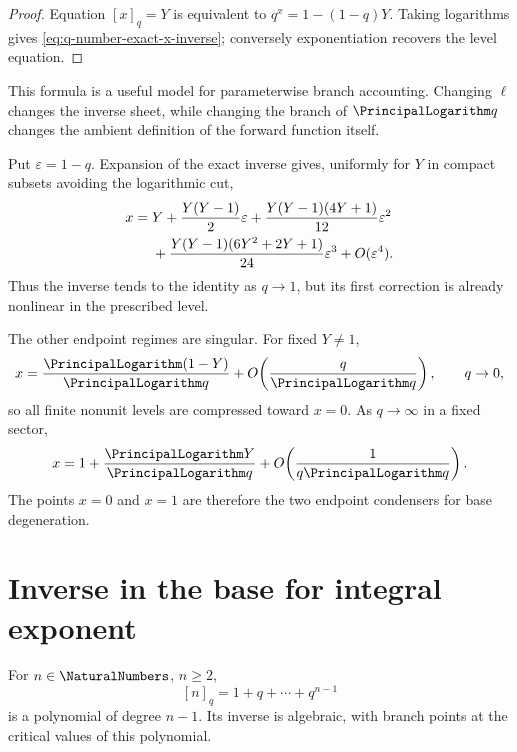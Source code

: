 \documentclass[11pt,a4paper,oneside,openany]{book}
\theoremstyle{definition}
\theoremstyle{remark}
\newcommand{\eps}{\varepsilon}
\begin{document}
\begin{proof}
Equation \([x]_q=Y\) is equivalent to
\(q^x=1-(1-q)Y\).  Taking logarithms gives
\eqref{eq:q-number-exact-x-inverse}; conversely exponentiation recovers the
level equation.
\end{proof}

This formula is a useful model for parameterwise branch accounting.  Changing
\(\ell\) changes the inverse sheet, while changing the branch of \(\PrincipalLogarithm q\)
changes the ambient definition of the forward function itself.

Put \(\eps=1-q\).  Expansion of the exact inverse gives, uniformly for \(Y\)
in compact subsets avoiding the logarithmic cut,
\begin{align}
 x={}&Y+\frac{Y(Y-1)}2\eps
 +\frac{Y(Y-1)(4Y+1)}{12}\eps^2 \notag\\
 &+\frac{Y(Y-1)(6Y^2+2Y+1)}{24}\eps^3+O(\eps^4).
 \label{eq:q-number-x-qone}
\end{align}
Thus the inverse tends to the identity as \(q\to1\), but its first correction
is already nonlinear in the prescribed level.

The other endpoint regimes are singular.  For fixed \(Y\ne1\),
\begin{equation}\label{eq:q-number-x-qzero}
 x=\frac{\PrincipalLogarithm(1-Y)}{\PrincipalLogarithm q}
   +O\!\left(\frac{q}{\PrincipalLogarithm q}\right),\qquad q\to0,
\end{equation}
so all finite nonunit levels are compressed toward \(x=0\).  As
\(q\to\infty\) in a fixed sector,
\begin{equation}\label{eq:q-number-x-qinfty}
 x=1+\frac{\PrincipalLogarithm Y}{\PrincipalLogarithm q}
   +O\!\left(\frac1{q\PrincipalLogarithm q}\right).
\end{equation}
The points \(x=0\) and \(x=1\) are therefore the two endpoint condensers for
base degeneration.

\section{Inverse in the base for integral exponent}

For \(n\in\NaturalNumbers\), \(n\ge2\),
\begin{equation}\label{eq:q-integer-polynomial}
 [n]_q=1+q+\cdots+q^{n-1}
\end{equation}
is a polynomial of degree \(n-1\).  Its inverse is algebraic, with branch
points at the critical values of this polynomial.
\end{document}
